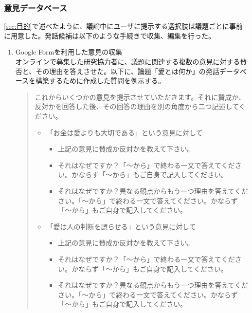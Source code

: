 \documentclass[11pt, a4paper]{jreport} %
\begin{document}
\subsubsection*{意見データベース}
\ref{sec:目的}で述べたように、議論中にユーザに提示する選択肢は議題ごとに事前に用意した。発話候補は以下のような手続きで収集、編集を行った。
\begin{enumerate}
\item Google Formを利用した意見の収集\\
オンラインで募集した研究協力者に、議題に関連する複数の意見に対する賛否と、その理由を答えさせた。以下に、論題「愛とは何か」の発話データベースを構築するために作成した質問を例示する。
\begin{quote}
これからいくつかの意見を提示させていただきます。それに賛成か、反対かを回答した後、その回答の理由を別の角度から二つ記述してください。
\begin{itemize}
\item 「お金は愛よりも大切である」という意見に対して
\begin{itemize}
\item 上記の意見に賛成か反対かを教えて下さい。
\item それはなぜですか？「〜から」で終わる一文で答えてください。かならず「〜から」もご自身で記入してください。
\item それはなぜですか？異なる観点からもう一つ理由を答えてください。「〜から」で終わる一文で答えてください。かならず「〜から」もご自身で記入してください。
\end{itemize}

\item 「愛は人の判断を誤らせる」という意見に対して
\begin{itemize}
\item 上記の意見に賛成か反対かを教えて下さい。
\item それはなぜですか？「〜から」で終わる一文で答えてください。かならず「〜から」もご自身で記入してください。
\item それはなぜですか？異なる観点からもう一つ理由を答えてください。「〜から」で終わる一文で答えてください。かならず「〜から」もご自身で記入してください。
\end{itemize}
\end{itemize}
\end{quote}


\end{enumerate}
\end{document}

